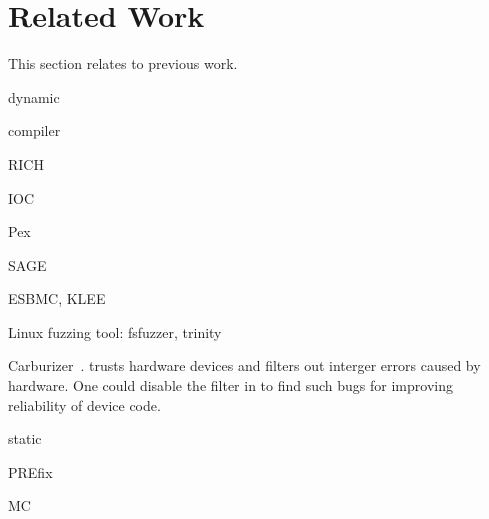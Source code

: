 \section{Related Work}
\label{s:relwk}

This section relates \sys to previous work.

dynamic

compiler

RICH~\cite{brumley:rich}

IOC

Pex

SAGE

ESBMC, KLEE

Linux fuzzing tool: fsfuzzer, trinity

Carburizer~\cite{kadav:tolerating}.
\sys trusts hardware devices and filters out interger errors
caused by hardware.  One could disable the filter in \sys
to find such bugs for improving reliability of device code.

static

PREfix~\cite{moy:prefix}

MC
